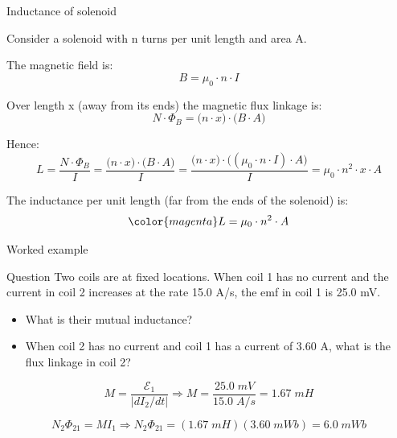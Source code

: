 \begin{frame}{Inductance of solenoid}

Consider a solenoid with n turns per unit length and area A.\\
\vspace{0.2cm}

The magnetic field is:
\begin{equation*}
    B = \mu_0 \cdot n \cdot  I
\end{equation*}

Over length x (away from its ends) the magnetic flux linkage is:
\begin{equation*}
    N \cdot \Phi_B = \Big( n \cdot  x \Big) \cdot \Big( B \cdot A \Big)
\end{equation*}

Hence:
\begin{equation*}
  L =
      \frac{N \cdot \Phi_B}{I} =
      \frac{\Big( n \cdot  x \Big) \cdot \Big( B \cdot A \Big)}{I} =
      \frac{\Big( n \cdot  x \Big) \cdot \Big( (\mu_0 \cdot n \cdot  I) \cdot A \Big)}{I} =
      \mu_0 \cdot n^2 \cdot x \cdot A
\end{equation*}

The inductance per unit length (far from the ends of the solenoid) is:
\begin{equation*}
{\color{magenta}
  L =  \mu_0 \cdot n^2 \cdot A
}
\end{equation*}

\end{frame}


%
%

{
\problemslide

\begin{frame}{Worked example}

\begin{blockexmplque}{Question}
  Two coils are at fixed locations. When coil 1 has no current and the
  current in coil 2 increases at the rate 15.0 A/s,
  the emf in coil 1 is 25.0 mV.
  \begin{itemize}
    \item What is their mutual inductance?
    \item When coil 2 has no current and coil 1 has a current of 3.60 A,
          what is the flux linkage in coil 2?
  \end{itemize}
\end{blockexmplque}

\begin{equation*}
   M = \frac{\mathcal{E}_1}{|dI_2/dt|} \Rightarrow
   M = \frac{25.0\; mV}{15.0\; A/s} = 1.67 \; mH
\end{equation*}

\begin{equation*}
   N_2 \Phi_{21} = M  I_1 \Rightarrow
   N_2 \Phi_{21} = (1.67 \; mH) (3.60 \; mWb) = 6.0 \; mWb
\end{equation*}

\end{frame}

} %


